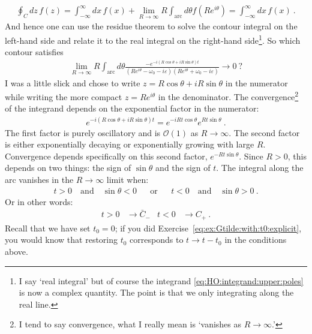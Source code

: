 \begin{align}
  \oint_C dz\, f(z) 
  = \int_{-\infty}^\infty dx\, f(x) + \lim_{R\to \infty} R \int_\text{arc} d\theta f(Re^{i\theta}) 
  = \int_{-\infty}^\infty dx\, f(x) \ .
\end{align}
And hence one can use the residue theorem to solve the contour integral on the left-hand side and relate it to the real integral on the right-hand side\footnote{I say `real integral' but of course the integrand \eqref{eq:HO:integrand:upper:poles} is now a complex quantity. The point is that we  only integrating along the real line.}. 
%
So which contour satisfies
\begin{align}
  \lim_{R\to \infty} R \int_\text{arc} d\theta 
  \frac{-e^{-i(R\cos\theta + iR\sin\theta) t}}{(Re^{i\theta} - \omega_0 - i\varepsilon)(Re^{i\theta} + \omega_0 - i\varepsilon)}
  \to 0 \ ?
\end{align}
I was a little slick and chose to write $z = R\cos\theta + iR\sin\theta$ in the numerator while writing the more compact $z=Re^{i\theta}$ in the denominator. The convergence\footnote{I tend to say convergence, what I really mean is `vanishes as $R\to \infty$.'} of the integrand depends on the exponential factor in the numerator:
\begin{align}
  e^{-i(R\cos\theta + iR\sin\theta) t} = 
  e^{-iRt\cos\theta} e^{Rt\sin\theta} \ .
\end{align}
The first factor is purely oscillatory and is $\mathcal O(1)$ as $R\to\infty$. The second factor is either exponentially decaying or exponentially growing with large $R$. Convergence depends specifically on this second factor, $e^{-Rt\sin\theta}$. Since $R>0$, this depends on two things: the sign of $\sin\theta$ and the sign of $t$. The integral along the arc vanishes in the $R\to\infty$ limit when:
\begin{align}
  t > 0 \quad\text{and}\quad \sin\theta < 0 &
  &\text{or}&&
  t < 0 \quad\text{and}\quad \sin\theta > 0 \ .
  \label{eq:t:gtr:less:upper:poles}
\end{align}
Or in other words:
\begin{align}
  t>0 &\to \bar C_{-} 
  &
  t<0 &\to C_+ \ .
  \label{eq:t:sign:contour:HO}
\end{align}
Recall that we have set $t_0 = 0$; if you did Exercise~\ref{eq:ex:Gtilde:with:t0:explicit}, you would know that restoring $t_0$ corresponds to $t\to t-t_0$ in the conditions above.

